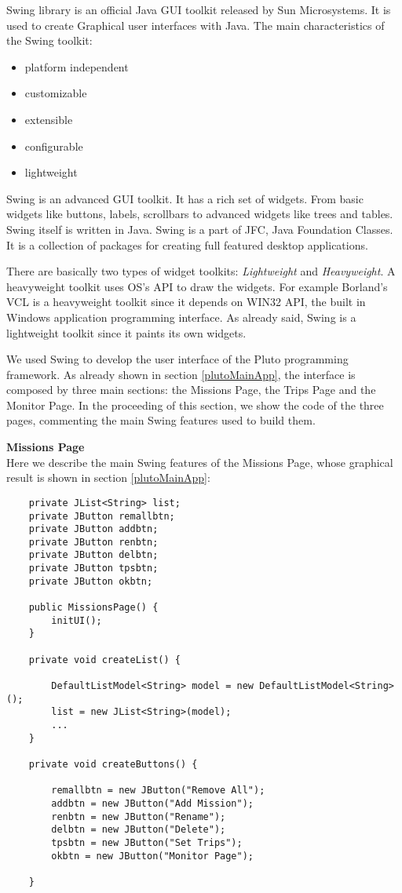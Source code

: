 Swing library is an official Java GUI toolkit released by Sun Microsystems. It is used to create Graphical user interfaces with Java.
The main characteristics of the Swing toolkit:
\begin{itemize}
\item platform independent
\item customizable
\item extensible
\item configurable
\item lightweight
\end{itemize}

Swing is an advanced GUI toolkit. It has a rich set of widgets. From basic widgets like buttons, labels, scrollbars to advanced widgets like trees and tables. Swing itself is written in Java.
Swing is a part of JFC, Java Foundation Classes. It is a collection of packages for creating full featured desktop applications.

There are basically two types of widget toolkits: \textit{Lightweight} and \textit{Heavyweight}.
A heavyweight toolkit uses OS's API to draw the widgets. For example Borland's VCL is a heavyweight toolkit since it depends on WIN32 API, the built in Windows application programming interface.
As already said, Swing is a lightweight toolkit since it paints its own widgets.

We used Swing to develop the user interface of the Pluto programming framework.
As already shown in section \ref{plutoMainApp}, the interface is composed by three main sections: the Missions Page, the Trips Page and the Monitor Page.
In the proceeding of this section, we show the code of the three pages, commenting the main Swing features used to build them.
\newpage

\textbf{Missions Page}
\\

Here we describe the main Swing features of the Missions Page, whose graphical result is shown in section \ref{plutoMainApp}:

\begin{lstlisting}
	private JList<String> list;
	private JButton remallbtn;
	private JButton addbtn;
	private JButton renbtn;
	private JButton delbtn;
	private JButton tpsbtn;
	private JButton okbtn;

	public MissionsPage() {
		initUI();
	}

	private void createList() {

		DefaultListModel<String> model = new DefaultListModel<String>();
		list = new JList<String>(model);
		...
	}

	private void createButtons() {

		remallbtn = new JButton("Remove All");
		addbtn = new JButton("Add Mission");
		renbtn = new JButton("Rename");
		delbtn = new JButton("Delete");
		tpsbtn = new JButton("Set Trips");
		okbtn = new JButton("Monitor Page");

	}
    
\end{lstlisting}

